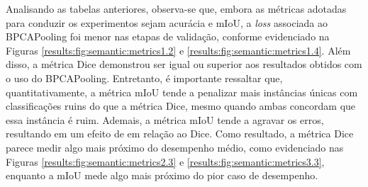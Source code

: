 Analisando as tabelas anteriores, observa-se que, embora as métricas adotadas para conduzir os experimentos sejam acurácia e mIoU, a \textit{loss} associada ao BPCAPooling foi menor nas etapas de validação, conforme evidenciado na Figuras \ref{results:fig:semantic:metrics1.2} e \ref{results:fig:semantic:metrics1.4}. Além disso, a métrica Dice demonstrou ser igual ou superior aos resultados obtidos com o uso do BPCAPooling. Entretanto, é importante ressaltar que, quantitativamente, a métrica mIoU tende a penalizar mais instâncias únicas com classificações ruins do que a métrica Dice, mesmo quando ambas concordam que essa instância é ruim. Ademais, a métrica mIoU tende a agravar os erros, resultando em um efeito de  em relação ao Dice. Como resultado, a métrica Dice parece medir algo mais próximo do desempenho médio, como evidenciado nas Figuras \ref{results:fig:semantic:metrics2.3} e \ref{results:fig:semantic:metrics3.3}, enquanto a mIoU mede algo mais próximo do pior caso de desempenho.

